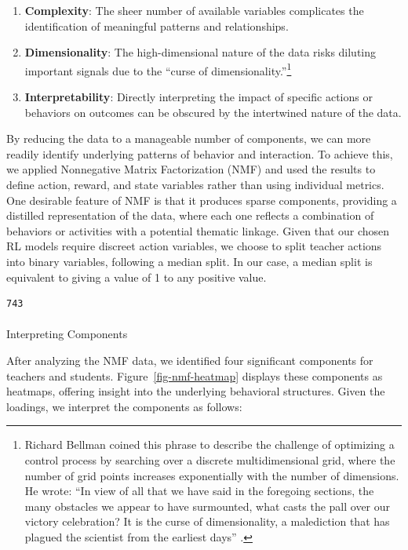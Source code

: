 \documentclass[
  number,
  preprint,
  3p,
  onecolumn]{elsarticle}
\makeatletter
\let\oldparagraph\paragraph
\renewcommand{\paragraph}{
    \@ifstar
      \xxxParagraphStar
      \xxxParagraphNoStar
  }
\newcommand{\xxxParagraphStar}[1]{\oldparagraph*{#1}\mbox{}}
\newcommand{\xxxParagraphNoStar}[1]{\oldparagraph{#1}\mbox{}}
\providecommand{\tightlist}{%
  \setlength{\itemsep}{0pt}\setlength{\parskip}{0pt}}\usepackage{longtable,booktabs,array}
\makeatother
\begin{document}
\begin{enumerate}
\def\labelenumi{\arabic{enumi}.}
\tightlist
\item
  \textbf{Complexity}: The sheer number of available variables
  complicates the identification of meaningful patterns and
  relationships.
\item
  \textbf{Dimensionality}: The high-dimensional nature of the data risks
  diluting important signals due to the ``curse of
  dimensionality.''\footnote{Richard Bellman coined this phrase to
    describe the challenge of optimizing a control process by searching
    over a discrete multidimensional grid, where the number of grid
    points increases exponentially with the number of dimensions. He
    wrote: ``In view of all that we have said in the foregoing sections,
    the many obstacles we appear to have surmounted, what casts the pall
    over our victory celebration? It is the curse of dimensionality, a
    malediction that has plagued the scientist from the earliest days''
    \citep{bellman2015adaptive}.}
\item
  \textbf{Interpretability}: Directly interpreting the impact of
  specific actions or behaviors on outcomes can be obscured by the
  intertwined nature of the data.
\end{enumerate}

By reducing the data to a manageable number of components, we can more
readily identify underlying patterns of behavior and interaction. To
achieve this, we applied Nonnegative Matrix Factorization (NMF) and used
the results to define action, reward, and state variables rather than
using individual metrics. One desirable feature of NMF is that it
produces sparse components, providing a distilled representation of the
data, where each one reflects a combination of behaviors or activities
with a potential thematic linkage. Given that our chosen RL models
require discreet action variables, we choose to split teacher actions
into binary variables, following a median split. In our case, a median
split is equivalent to giving a value of 1 to any positive value.

\begin{verbatim}
743
\end{verbatim}

\paragraph{Interpreting Components}\label{interpreting-components}

After analyzing the NMF data, we identified four significant components
for teachers and students. Figure~\ref{fig-nmf-heatmap} displays these
components as heatmaps, offering insight into the underlying behavioral
structures. Given the loadings, we interpret the components as follows:
\end{document}
